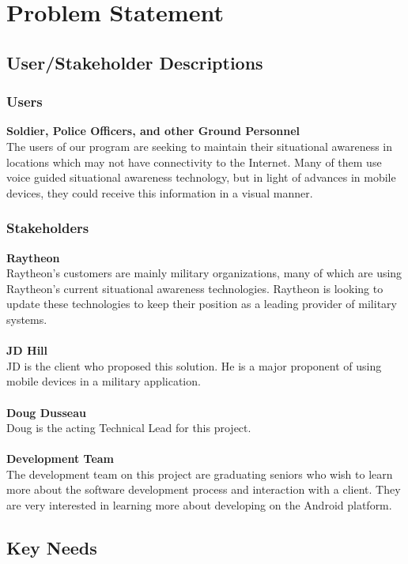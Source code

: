 \documentclass{article}
\begin{document}
\section{Problem Statement}
\subsection{User/Stakeholder Descriptions}
\subsubsection{Users} 
\textbf{Soldier, Police Officers, and other Ground Personnel}\\
The users of our program are seeking to maintain their situational awareness in locations which may not have connectivity to the Internet.  Many of them use voice guided situational awareness technology, but in light of advances in mobile devices, they could receive this information in a visual manner.  

\subsubsection{Stakeholders}
\textbf{Raytheon}\\
Raytheon's customers are mainly military organizations, many of which are using Raytheon's current situational awareness technologies.  Raytheon is looking to update these technologies to keep their position as a leading provider of military systems.\\ \\
\textbf{JD Hill}\\
JD is the client who proposed this solution.  He is a major proponent of using mobile devices in a military application.\\ \\
\textbf{Doug Dusseau}\\
Doug is the acting Technical Lead for this project. \\ \\
\textbf{Development Team}\\
The development team on this project are graduating seniors who wish to learn more about the software development process and interaction with a client.  They are very interested in learning more about developing on the Android platform.

\subsection{Key Needs}
\end{document}
